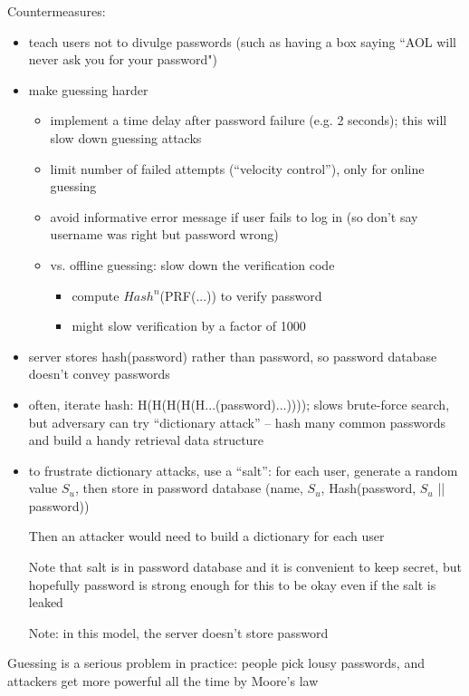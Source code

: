 Countermeasures:
\begin{itemize}
    \item teach users not to divulge passwords (such as having a box saying
            ``AOL will never ask you for your password")
    \item make guessing harder
    \begin{itemize}
    	\item implement a time delay after password failure (e.g. 2 seconds); this will slow down guessing attacks
        \item limit number of failed attempts (``velocity control''), only for
                online guessing
        \item avoid informative error message if user fails to log in (so don't
                say username was right but password wrong)
        \item vs. offline guessing: slow down the verification code
        	\begin{itemize}
		\item compute $Hash^n$(PRF(...)) to verify password
		\item might slow verification by a factor of 1000
	\end{itemize}
    \end{itemize}
    \item server stores hash(password) rather than password, so password
            database doesn't convey passwords
    \item often, iterate hash: H(H(H(H(H...(password)...)))); slows brute-force
            search, but adversary can try ``dictionary attack'' -- hash many
            common passwords and build a handy retrieval data structure
    \item to frustrate dictionary attacks, use a ``salt'': for each user,
            generate a random value $S_u$, then store in password database
            (name, $S_u$, Hash(password, $S_u$ || password))

            Then an attacker would need to build a dictionary for each user

            Note that salt is in password database and it is convenient to keep
            secret, but hopefully password is strong enough for this to be okay
            even if the salt is leaked
            
            Note: in this model, the server doesn't store password
\end{itemize}
Guessing is a serious problem in practice: people pick lousy passwords, and
attackers get more powerful all the time by Moore's law

